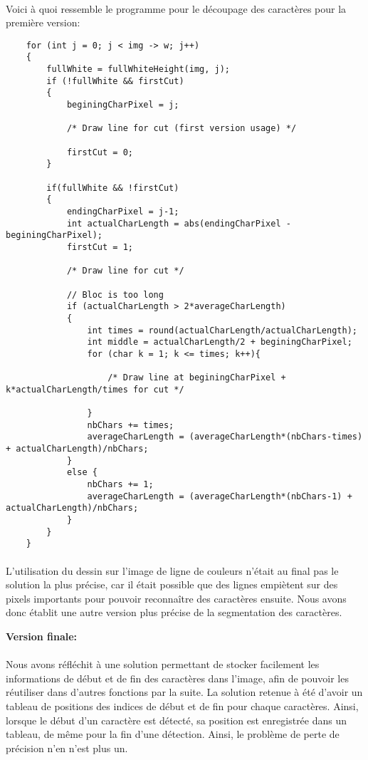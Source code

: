 \documentclass{article}
\begin{document}
	\paragraph{}
	Voici à quoi ressemble le programme pour le découpage des caractères pour la première version:
	\begin{lstlisting}
	for (int j = 0; j < img -> w; j++)
    {
        fullWhite = fullWhiteHeight(img, j);
        if (!fullWhite && firstCut)
        {
            beginingCharPixel = j;

            /* Draw line for cut (first version usage) */

            firstCut = 0;
        }
        
        if(fullWhite && !firstCut) 
        {
            endingCharPixel = j-1;
            int actualCharLength = abs(endingCharPixel - beginingCharPixel);
            firstCut = 1;
            
            /* Draw line for cut */

            // Bloc is too long
            if (actualCharLength > 2*averageCharLength)
            {
                int times = round(actualCharLength/actualCharLength);
                int middle = actualCharLength/2 + beginingCharPixel;
                for (char k = 1; k <= times; k++){
                    
                    /* Draw line at beginingCharPixel + k*actualCharLength/times for cut */

                }
                nbChars += times;
                averageCharLength = (averageCharLength*(nbChars-times) + actualCharLength)/nbChars;
            }
            else {
                nbChars += 1;
                averageCharLength = (averageCharLength*(nbChars-1) + actualCharLength)/nbChars;
            }
        }
    }
	\end{lstlisting}
	
	\paragraph{}
    L'utilisation du dessin sur l'image de ligne de couleurs n'était au final pas le solution la plus précise, car il était possible que des lignes empiètent sur des pixels importants pour pouvoir reconnaître des caractères ensuite. Nous avons donc établit une autre version plus précise de la segmentation des caractères.
    
    \textbf{Version finale:}\\
    \paragraph{}
    Nous avons réfléchit à une solution permettant de stocker facilement les informations de début et de fin des caractères dans l'image, afin de pouvoir les réutiliser dans d'autres fonctions par la suite. La solution retenue à été d'avoir un tableau de positions des indices de début et de fin pour chaque caractères. Ainsi, lorsque le début d'un caractère est détecté, sa position est enregistrée dans un tableau, de même pour la fin d'une détection. Ainsi, le problème de perte de précision n'en n'est plus un.
	
\end{document}
